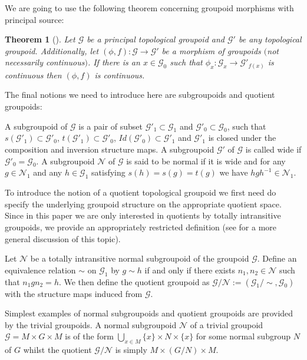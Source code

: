 \documentclass[11pt]{article}
\newtheorem{tw}{Theorem}[section]
\begin{document}
We are going to use the following theorem concerning groupoid morphisms with principal source:
\begin{tw}[{\cite[Proposition 1.21]{McK1}}] \label{AFPG} Let $\mathcal{G}$ be a principal topological groupoid and $\mathcal{G}'$ be any topological groupoid. Additionally, let $(\phi,f)\colon \mathcal{G}\rightarrow\mathcal{G}'$ be a morphism of groupoids $($not necessarily continuous$)$. If there is an $x\in\mathcal{G}_0$ such that $\phi_x\colon \mathcal{G}_x\rightarrow\mathcal{G}'_{f(x)}$ is continuous then $(\phi,f)$ is continuous.
\end{tw}

The final notions we need to introduce here are subgroupoids and quotient groupoids:
\begin{defi} A subgroupoid of $\mathcal{G}$ is a pair of subset $\mathcal{G}'_1\subset\mathcal{G}_1$ and $\mathcal{G}'_0\subset\mathcal{G}_0$, such that $s(\mathcal{G}'_1)\subset\mathcal{G}'_0$, $t(\mathcal{G}'_1)\subset\mathcal{G}'_0$, $Id(\mathcal{G}'_0)\subset\mathcal{G}'_1$ and $\mathcal{G}'_1$ is closed under the composition and inversion structure maps. A subgroupoid $\mathcal{G}'$ of $\mathcal{G}$ is called wide if $\mathcal{G}'_0=\mathcal{G}_0$. A subgroupoid $\mathcal{N}$ of $\mathcal{G}$ is said to be normal if it is wide and for any $g\in\mathcal{N}_1$ and any $h\in\mathcal{G}_1$ satisfying $s(h)=s(g)=t(g)$ we have $hgh^{-1}\in\mathcal{N}_1$.
\end{defi}
To introduce the notion of a quotient topological groupoid we first need do specify the underlying groupoid structure on the appropriate quotient space. Since in this paper we are only interested in quotients by totally intransitive groupoids, we provide an appropriately restricted definition (see \cite{McK1} for a more general discussion of this topic).
\begin{defi} Let $\mathcal{N}$ be a totally intransitive normal subgroupoid of the groupoid $\mathcal{G}$. Define an equivalence relation $\sim$ on $\mathcal{G}_1$ by $g\sim h$ if and only if there exists $n_1,n_2\in\mathcal{N}$ such that $n_1gn_2=h$. We then define the quotient groupoid as $\mathcal{G}\slash\mathcal{N}:=(\mathcal{G}_1\slash\sim,\mathcal{G}_0)$ with the structure maps induced from $\mathcal{G}$.
\end{defi}
\begin{egg} Simplest examples of normal subgroupoids and quotient groupoids are provided by the trivial groupoids. A normal subgroupoid $\mathcal{N}$ of a trivial groupoid $\mathcal{G}=M\times G\times M$ is of the form $\bigcup\limits_{x\in M} \{ x\}\times N\times \{ x\}$ for some normal subgroup $N$ of $G$ whilst the quotient $\mathcal{G}\slash\mathcal{N}$ is simply $M\times (G\slash N)\times M$.
\end{egg}
\end{document}
